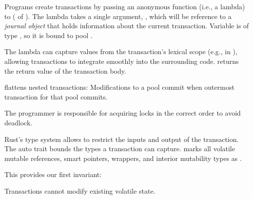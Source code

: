 Programs create transactions by passing an anonymous function (i.e., a lambda) to  ( of ).
The lambda takes a single
argument, , which will be reference to a \emph{journal object} that holds information about the current transaction.  Variable
 is of type , so it is bound to pool .  

The lambda can capture values from the transaction's lexical scope (e.g.,  in ), allowing
transactions to integrate smoothly into the surrounding code.
 returns the return value of the transaction body.

\This{} flattens nested transactions: Modifications to a
pool commit when outermost transaction for that pool commits.  

The programmer is responsible for acquiring locks in the correct order to avoid deadlock.

Rust's type system allows \this{} to restrict the inputs and output of the
transaction.  The  auto trait bounds the types a transaction
can capture.  \This{} marks all volatile mutable references, smart pointers, wrappers,
and interior mutability types as .

This provides our first invariant:

\begin{invar}
  \label{inv:tx-no-volatile-mut}
  Transactions cannot modify existing volatile state.
\end{invar}

